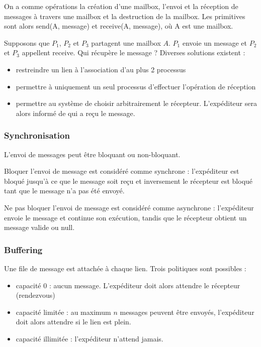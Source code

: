 	On a comme opérations la création d'une mailbox, l'envoi et la réception de messages à travers une mailbox et la destruction de la mailbox. Les primitives sont alors send(A, message) et receive(A, message), où A est une mailbox.
	
	Supposons que $P_1$, $P_2$ et $P_3$ partagent une mailbox $A$. $P_1$ envoie un message et $P_2$ et $P_3$ appellent receive. Qui récupère le message ? Diverses solutions existent :
	
	\begin{itemize}
		\item restreindre un lien à l'association d'au plus 2 processus
		\item permettre à uniquement un seul processus d'effectuer l'opération de réception
		\item permettre au système de choisir arbitrairement le récepteur. L'expéditeur sera alors informé de qui a reçu le message.
	\end{itemize}
	
	
	\subsubsection{Synchronisation}
	
	L'envoi de messages peut être bloquant ou non-bloquant.
	
	Bloquer l'envoi de message est considéré comme synchrone : l'expéditeur est bloqué jusqu'à ce que le message soit reçu et inversement le récepteur est bloqué tant que le message n'a pas été envoyé.
	
	Ne pas bloquer l'envoi de message est considéré comme asynchrone : l'expéditeur envoie le message et continue son exécution, tandis que le récepteur obtient un message valide ou null.
	
	\subsubsection{Buffering}
	
	Une file de message est attachée à chaque lien. Trois politiques sont possibles :
	
	\begin{itemize}
		\item capacité 0 : aucun message. L'expéditeur doit alors attendre le récepteur (rendezvous)
		\item capacité limitée : au maximum $n$ messages peuvent être envoyés, l'expéditeur doit alors attendre si le lien est plein.
		\item capacité illimitée : l'expéditeur n'attend jamais.
	\end{itemize}